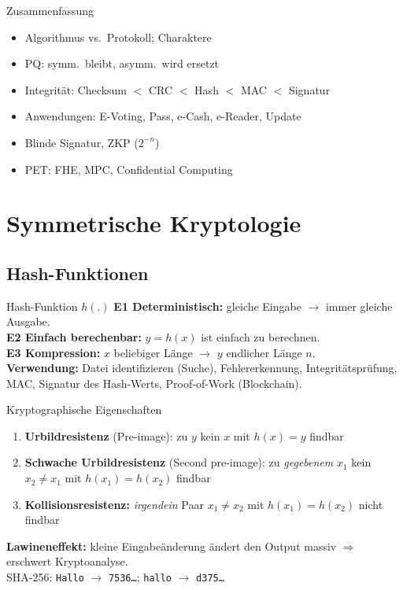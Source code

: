 \documentclass[a4paper, fontsize=7pt]{scrartcl}
\begin{document}
\begin{subbox}{Zusammenfassung}
\begin{itemize}
    \item Algorithmus vs.\ Protokoll; Charaktere
    \item PQ: symm.\ bleibt, asymm.\ wird ersetzt
    \item Integrität: Checksum $<$ CRC $<$ Hash $<$ MAC $<$ Signatur
    \item Anwendungen: E-Voting, Pass, e-Cash, e-Reader, Update
    \item Blinde Signatur, ZKP ($2^{-n}$)
    \item PET: FHE, MPC, Confidential Computing
\end{itemize}
\end{subbox}

\section{Symmetrische Kryptologie}

\subsection{Hash-Funktionen}

\begin{mainbox}{Hash-Funktion $h(.)$}
\textbf{E1 Deterministisch:} gleiche Eingabe $\to$ immer gleiche Ausgabe.\\
\textbf{E2 Einfach berechenbar:} $y = h(x)$ ist einfach zu berechnen.\\
\textbf{E3 Kompression:} $x$ beliebiger Länge $\to$ $y$ endlicher Länge $n$.\\[2pt]
\textbf{Verwendung:} Datei identifizieren (Suche), Fehlererkennung,
Integritätsprüfung, MAC, Signatur des Hash-Werts, Proof-of-Work (Blockchain).
\end{mainbox}

\begin{mainbox}{Kryptographische Eigenschaften}
\begin{enumerate}
    \item \textbf{Urbildresistenz} (Pre-image): zu $y$ kein $x$ mit $h(x) = y$ findbar
    \item \textbf{Schwache Urbildresistenz} (Second pre-image): zu \emph{gegebenem}
          $x_1$ kein $x_2 \neq x_1$ mit $h(x_1) = h(x_2)$ findbar
    \item \textbf{Kollisionsresistenz:} \emph{irgendein} Paar $x_1 \neq x_2$ mit
          $h(x_1) = h(x_2)$ nicht findbar
\end{enumerate}
\textbf{Lawineneffekt:} kleine Eingabeänderung ändert den Output massiv
$\Rightarrow$ erschwert Kryptoanalyse.\\
SHA-256: \texttt{Hallo} $\to$ \texttt{7536\dots}; \texttt{hallo} $\to$
\texttt{d375\dots}
\end{mainbox}
\end{document}
